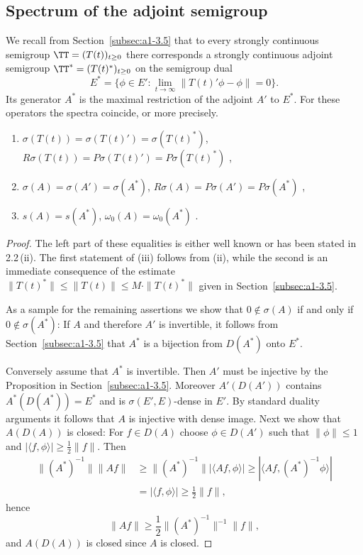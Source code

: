 \subsection{Spectrum of the adjoint semigroup}\label{subsec:a3-4.4}%
We recall from Section~\ref{subsec:a1-3.5} that to every strongly continuous semigroup $\TT = (T(t))_{t \geq 0}$ there corresponds a strongly continuous adjoint semigroup $\TT^{*} = (T(t)^{*})_{t \geq 0}$ on the semigroup dual
\[
E^{*} = \{\phi \in E' \colon \lim_{t \to \infty} \|T(t)'\phi-\phi\| = 0\} .
\]
Its generator $A^{*}$ is the maximal restriction of the adjoint $A'$ to $E^{*}$.
For these operators the spectra coincide, or more precisely.
\begin{enumerate}[\upshape (i)]
\item 
$\sigma(T(t)) = \sigma(T(t)') = \sigma(T(t)^{*})$,\\
$R\sigma(T(t)) = P\sigma(T(t)') = P\sigma(T(t)^{*})$ ,

\item 
$\sigma(A) = \sigma(A') = \sigma(A^{*})$, $R\sigma(A) = P\sigma(A') = P\sigma(A^{*})$ ,
\item 
$s(A) = s(A^{*})$, $\omega_{0}(A) = \omega_{0}(A^{*})$ .
\end{enumerate}
\begin{proof}
The left part of these equalities is either well known or has been stated in 
2.2\,(ii).
The first statement of (iii) follows from (ii), while the second is an immediate consequence of the estimate $\|T(t)^{*}\| \leq \|T(t)\| \leq M\cdot\|T(t)^{*}\|$ given in Section~\ref{subsec:a1-3.5}.

As a sample for the remaining assertions we show that $0 \notin \sigma(A)$ if and only if\/ $0 \notin \sigma(A^{*})$:
If\/ $A$ and therefore $A'$ is invertible, it follows from Section~\ref{subsec:a1-3.5} that $A^{*}$ is a bijection from $D(A^{*})$ onto $E^{*}$.

Conversely assume that $A^{*}$ is invertible.
Then $A'$ must be injective by the Proposition in Section~\ref{subsec:a1-3.5}.
Moreover $A'(D(A'))$ contains $A^{*}(D(A^{*})) = E^{*}$ and is $\sigma(E',E)$-dense in $E'$.
By standard duality arguments it follows that $A$ is injective with dense image.
Next we show that $A(D(A))$ is closed: For $f \in D(A)$ choose $\phi \in D(A')$ such that $\|\phi\| \leq 1$ and $|\langle f,\phi \rangle| \geq \frac{1}{2}\|f\|$.
Then
\begin{align*}
\|(A^{*})^{-1}\| \|Af\| &\geq \|(A^{*})^{-1}\| |\langle Af,\phi \rangle| \geq |\langle Af,(A^{*})^{-1}\phi \rangle| \\
&= |\langle f,\phi \rangle| \geq \frac{1}{2}\|f\| ,
\end{align*}
hence
\[
\|Af\| \geq \frac{1}{2}\|(A^{*})^{-1}\|^{-1}\|f\| ,
\]
and $A(D(A))$ is closed since $A$ is closed.
\end{proof}
